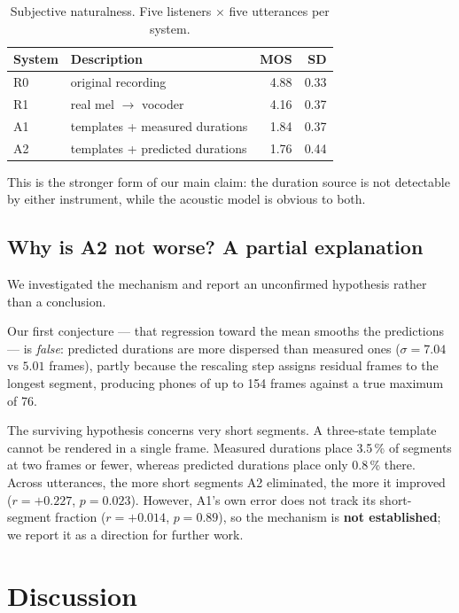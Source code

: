 \documentclass[conference]{IEEEtran}
\begin{document}
\begin{table}[t]
\caption{Subjective naturalness. Five listeners $\times$ five utterances per system.}
\label{tab:mos}
\centering
\begin{tabular}{llrr}
\toprule
\textbf{System} & \textbf{Description} & \textbf{MOS} & \textbf{SD} \\
\midrule
R0 & original recording          & 4.88 & 0.33 \\
R1 & real mel $\rightarrow$ vocoder & 4.16 & 0.37 \\
A1 & templates + measured durations & 1.84 & 0.37 \\
A2 & templates + predicted durations & 1.76 & 0.44 \\
\bottomrule
\end{tabular}
\end{table}

This is the stronger form of our main claim: the duration source is not detectable by either
instrument, while the acoustic model is obvious to both.

\subsection{Why is A2 not worse? A partial explanation}
We investigated the mechanism and report an unconfirmed hypothesis rather than a conclusion.

Our first conjecture --- that regression toward the mean smooths the predictions --- is
\emph{false}: predicted durations are more dispersed than measured ones ($\sigma = 7.04$ vs
$5.01$ frames), partly because the rescaling step assigns residual frames to the longest segment,
producing phones of up to 154 frames against a true maximum of 76.

The surviving hypothesis concerns very short segments. A three-state template cannot be rendered
in a single frame. Measured durations place 3.5\,\% of segments at two frames or fewer, whereas
predicted durations place only 0.8\,\% there. Across utterances, the more short segments A2
eliminated, the more it improved ($r = +0.227$, $p = 0.023$). However, A1's own error does not
track its short-segment fraction ($r = +0.014$, $p = 0.89$), so the mechanism is \textbf{not
established}; we report it as a direction for further work.

\section{Discussion}
\end{document}
